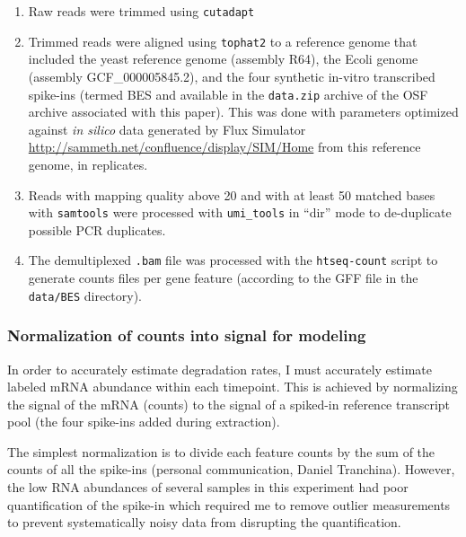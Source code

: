 \begin{enumerate}
  \setlength\itemsep{0em}
  \item Raw reads were trimmed using \texttt{cutadapt} \parencite{martin2011cutadapt}
  \item Trimmed reads were aligned using \texttt{tophat2} \parencite{kim2013tophat2}
    to a reference genome that included the yeast reference 
     genome (assembly R64), the Ecoli genome (assembly 
     GCF\_000005845.2), and the four synthetic in-vitro transcribed 
     spike-ins (termed BES and available in the \texttt{data.zip} 
     archive of the OSF archive associated with this paper). 
     This was done with parameters optimized 
     against \emph{in silico} data generated by Flux Simulator
     \url{http://sammeth.net/confluence/display/SIM/Home} from this 
     reference genome, in replicates.
  \item Reads with mapping quality above 20 and with at least 50 
    matched bases with 
    \texttt{samtools} \parencite{li2009sequence}
    were processed with \texttt{umi\_tools} \parencite{smith2017umi}
    in ``dir'' mode to
    de-duplicate possible PCR duplicates.
  \item The demultiplexed \texttt{.bam} file was processed with the
    \texttt{htseq-count} \parencite{anders2015htseq}
    script to generate counts files per gene feature (according to 
    the GFF file in the \texttt{data/BES} directory).
\end{enumerate}

\subsubsection{Normalization of counts into signal for modeling}

\label{subsec:4tuNormalization}

In order to accurately estimate degradation rates, I must accurately
estimate labeled mRNA abundance within each timepoint. This is
achieved by normalizing the signal of the mRNA (counts) to the signal
of a spiked-in reference transcript pool (the four spike-ins added
during extraction).

The simplest normalization is to divide each feature counts
by the sum of the counts of all the spike-ins (personal communication,
Daniel Tranchina). However, the low RNA abundances of several 
samples in this experiment had poor quantification of the spike-in 
which required me to remove outlier measurements to prevent 
systematically noisy data from
disrupting the quantification. 

